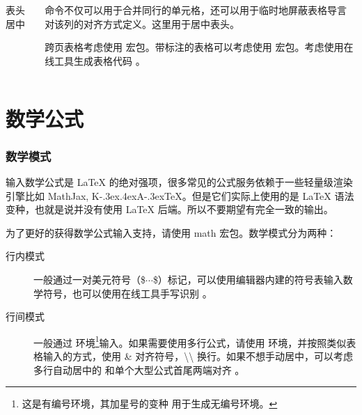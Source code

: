 \begin{shadedsection}
\begin{frame}[fragile]
\begin{columns}
\begin{column}{0.6\textwidth}
\begin{codeblock}[]{表头居中}
      \end{codeblock}
    \end{column}
    \begin{column}{0.4\textwidth}
       命令不仅可以用于合并同行的单元格，还可以用于临时地屏蔽表格导言对该列的对齐方式定义。这里用于居中表头。
      \begin{center}
        \parbox{0.85\linewidth}{
        }
      \end{center}
      跨页表格考虑使用  宏包。带标注的表格可以考虑使用  宏包。考虑使用在线工具生成表格代码 。
    \end{column}
  \end{columns}
\end{frame}

\section{数学公式}
\begin{frame}
  \frametitle{数学模式}
  \begin{alertblock}{}
  输入数学公式是 \LaTeX{} 的绝对强项，很多常见的公式服务依赖于一些轻量级渲染引擎比如 MathJax, K\kern-.3ex\raise.4ex\hbox{\footnotesize A}\kern-.3ex\TeX{}。但是它们实际上使用的是 \LaTeX{} 语法变种，也就是说并没有使用 \LaTeX{} 后端。所以不要期望有完全一致的输出。
  \end{alertblock}

  为了更好的获得数学公式输入支持，请使用 math 宏包。数学模式分为两种：
  \begin{description}
    \item[行内模式] 一般通过一对美元符号（\$$\cdots$\$）标记，可以使用编辑器内建的符号表输入数学符号，也可以使用在线工具手写识别 。
    \item[行间模式] 一般通过  环境\footnote{这是有编号环境，其加星号的变种  用于生成无编号环境。}输入。如果需要使用多行公式，请使用  环境，并按照类似表格输入的方式，使用 \& 对齐符号，\textbackslash\textbackslash{} 换行。如果不想手动居中，可以考虑多行自动居中的  和单个大型公式首尾两端对齐 。
  \end{description}
\end{frame}
\end{shadedsection}
